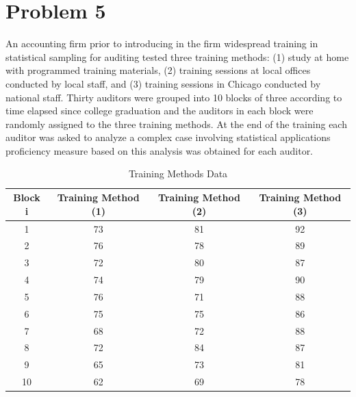 \documentclass{article}
\begin{document}
\section{Problem 5}
An accounting firm prior to introducing in the firm widespread training in statistical sampling
for auditing tested three training methods: (1) study at home with programmed training materials,
(2) training sessions at local offices conducted by local staff, and (3) training sessions in Chicago conducted
by national staff. Thirty auditors were grouped into 10 blocks of three according to time elapsed
since college graduation and the auditors in each block were randomly assigned to the three training
methods. At the end of the training each auditor was asked to analyze a complex case involving statistical
applications proficiency measure based on this analysis was obtained for each auditor.
\begin{table}[!ht]
	\centering
	\caption{Training Methods Data}
	\begin{tabular}{c c c c}
		\hline
		\textbf{Block i} & \textbf{Training Method (1)} & \textbf{Training Method (2)} & \textbf{Training Method (3)} \\
		\hline
		1                & 73                           & 81                           & 92                           \\
		2                & 76                           & 78                           & 89                           \\
		3                & 72                           & 80                           & 87                           \\
		4                & 74                           & 79                           & 90                           \\
		5                & 76                           & 71                           & 88                           \\
		6                & 75                           & 75                           & 86                           \\
		7                & 68                           & 72                           & 88                           \\
		8                & 72                           & 84                           & 87                           \\
		9                & 65                           & 73                           & 81                           \\
		10               & 62                           & 69                           & 78                           \\
		\hline
	\end{tabular}
\end{table}
\end{document}

